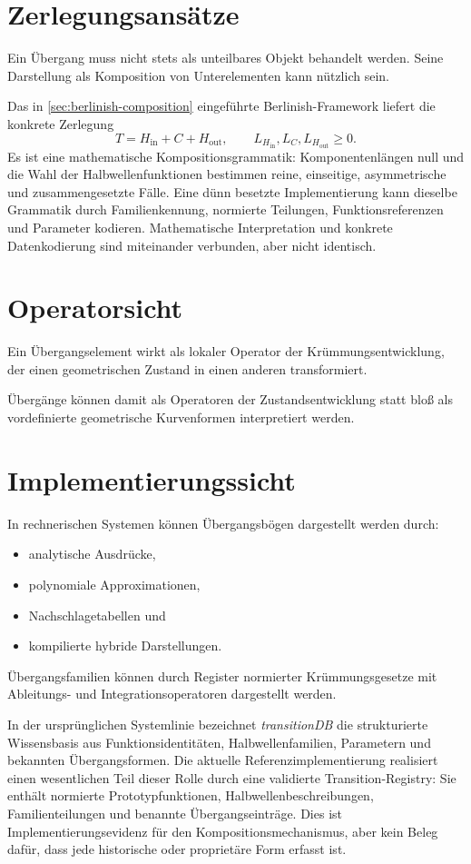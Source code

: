 \section{Zerlegungsansätze}
Ein Übergang muss nicht stets als unteilbares Objekt behandelt werden. Seine
Darstellung als Komposition von Unterelementen kann nützlich sein.

Das in \cref{sec:berlinish-composition} eingeführte Berlinish-Framework liefert
die konkrete Zerlegung
\[
T=H_{\mathrm{in}}+C+H_{\mathrm{out}},
\qquad
L_{H_{\mathrm{in}}},L_C,L_{H_{\mathrm{out}}}\geq 0.
\]
Es ist eine mathematische Kompositionsgrammatik: Komponentenlängen null und die
Wahl der Halbwellenfunktionen bestimmen reine, einseitige, asymmetrische und
zusammengesetzte Fälle. Eine dünn besetzte Implementierung kann dieselbe
Grammatik durch Familienkennung, normierte Teilungen, Funktionsreferenzen und
Parameter kodieren. Mathematische Interpretation und konkrete Datenkodierung
sind miteinander verbunden, aber nicht identisch.

\section{Operatorsicht}
\begin{principle}
Ein Übergangselement wirkt als lokaler Operator der Krümmungsentwicklung, der
einen geometrischen Zustand in einen anderen transformiert.
\end{principle}
Übergänge können damit als Operatoren der Zustandsentwicklung statt bloß als
vordefinierte geometrische Kurvenformen interpretiert werden.

\section{Implementierungssicht}
In rechnerischen Systemen können Übergangsbögen dargestellt werden durch:
\begin{itemize}
\item analytische Ausdrücke,
\item polynomiale Approximationen,
\item Nachschlagetabellen und
\item kompilierte hybride Darstellungen.
\end{itemize}
Übergangsfamilien können durch Register normierter Krümmungsgesetze mit
Ableitungs- und Integrationsoperatoren dargestellt werden.

In der ursprünglichen Systemlinie bezeichnet \emph{transitionDB} die
strukturierte Wissensbasis aus Funktionsidentitäten, Halbwellenfamilien,
Parametern und bekannten Übergangsformen. Die aktuelle
Referenzimplementierung realisiert einen wesentlichen Teil dieser Rolle durch
eine validierte Transition-Registry: Sie enthält normierte
Prototypfunktionen, Halbwellenbeschreibungen, Familienteilungen und benannte
Übergangseinträge. Dies ist Implementierungsevidenz für den
Kompositionsmechanismus, aber kein Beleg dafür, dass jede historische oder
proprietäre Form erfasst ist.

